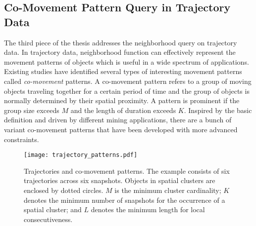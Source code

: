 \subsection{Co-Movement Pattern Query in Trajectory Data}
The third piece of the thesis addresses the neighborhood
query on trajectory data. In trajectory data, neighborhood
function can effectively represent the movement patterns
of objects which is useful in a wide
spectrum of applications. 
%
%
%
Existing studies have identified several types of interesting movement patterns called \emph{co-movement} patterns. A co-movement pattern refers to a group of moving objects traveling together for a certain period of time and the group of objects is normally determined by their spatial proximity. A pattern is prominent if the group size exceeds $M$ and the length of duration exceeds $K$. 
Inspired by the basic definition 
and driven by different mining applications, there are a bunch of variant 
co-movement patterns that have been developed with more advanced constraints.

\begin{figure}[h]
\centering
\texttt{[image: trajectory\_patterns.pdf]}
\caption{Trajectories and co-movement patterns. The example consists of six trajectories across six snapshots. Objects in spatial clusters are enclosed by dotted circles. $M$ is the minimum cluster cardinality; $K$ denotes the minimum number of snapshots for the occurrence of a spatial cluster; and $L$ denotes the minimum length for local consecutiveness.}
\label{fig:related_work}
\end{figure}


